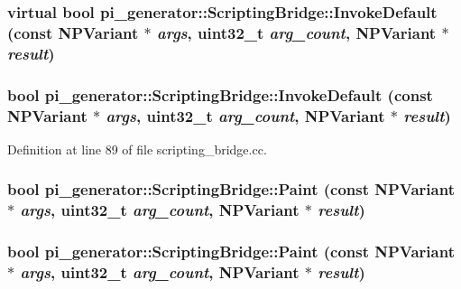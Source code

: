 \hypertarget{classpi__generator_1_1_scripting_bridge_abe1c6a84817b0a53c83527cbdc118dba}{
\subsubsection[{InvokeDefault}]{\setlength{\rightskip}{0pt plus 5cm}virtual bool pi\_\-generator::ScriptingBridge::InvokeDefault (const NPVariant $\ast$ {\em args}, \/  uint32\_\-t {\em arg\_\-count}, \/  NPVariant $\ast$ {\em result})}}
\label{classpi__generator_1_1_scripting_bridge_abe1c6a84817b0a53c83527cbdc118dba}
\hypertarget{classpi__generator_1_1_scripting_bridge_a0589fe559ec8b9297e37239233e238be}{
\subsubsection[{InvokeDefault}]{\setlength{\rightskip}{0pt plus 5cm}bool pi\_\-generator::ScriptingBridge::InvokeDefault (const NPVariant $\ast$ {\em args}, \/  uint32\_\-t {\em arg\_\-count}, \/  NPVariant $\ast$ {\em result})}}
\label{classpi__generator_1_1_scripting_bridge_a0589fe559ec8b9297e37239233e238be}


Definition at line 89 of file scripting\_\-bridge.cc.

\hypertarget{classpi__generator_1_1_scripting_bridge_afcd2c9c3e990cae2d713e8bb5d84048d}{
\subsubsection[{Paint}]{\setlength{\rightskip}{0pt plus 5cm}bool pi\_\-generator::ScriptingBridge::Paint (const NPVariant $\ast$ {\em args}, \/  uint32\_\-t {\em arg\_\-count}, \/  NPVariant $\ast$ {\em result})}}
\label{classpi__generator_1_1_scripting_bridge_afcd2c9c3e990cae2d713e8bb5d84048d}
\hypertarget{classpi__generator_1_1_scripting_bridge_afcd2c9c3e990cae2d713e8bb5d84048d}{
\subsubsection[{Paint}]{\setlength{\rightskip}{0pt plus 5cm}bool pi\_\-generator::ScriptingBridge::Paint (const NPVariant $\ast$ {\em args}, \/  uint32\_\-t {\em arg\_\-count}, \/  NPVariant $\ast$ {\em result})}}
\label{classpi__generator_1_1_scripting_bridge_afcd2c9c3e990cae2d713e8bb5d84048d}


